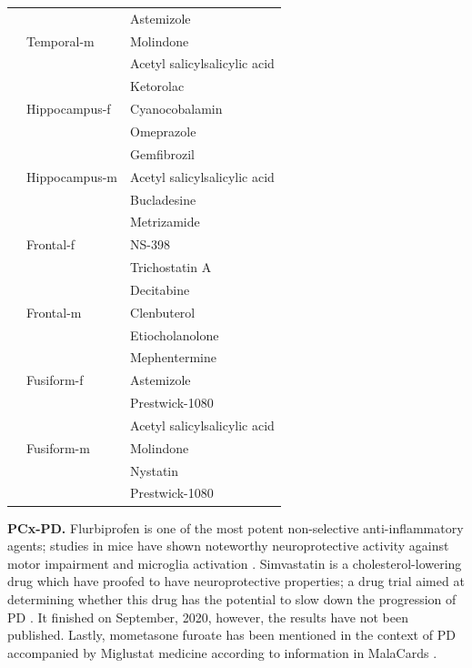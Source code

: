 \begin{table}[!ht]
\begin{tabular}{l|ll}
            &                   & Astemizole                   \\
            & Temporal-m        & Molindone                    \\
            &                   & Acetyl salicylsalicylic acid \\
            &                   & Ketorolac                    \\
            & Hippocampus-f     & Cyanocobalamin               \\
            &                   & Omeprazole                   \\
            &                   & Gemfibrozil                  \\
            & Hippocampus-m     & Acetyl salicylsalicylic acid \\
            &                   & Bucladesine                  \\
            &                   & Metrizamide                  \\
            & Frontal-f         & NS-398                       \\
            &                   & Trichostatin A               \\
            &                   & Decitabine                   \\
            & Frontal-m         & Clenbuterol                  \\
            &                   & Etiocholanolone              \\
            &                   & Mephentermine                \\
            & Fusiform-f        & Astemizole                   \\
            &                   & Prestwick-1080               \\
            &                   & Acetyl salicylsalicylic acid \\
            & Fusiform-m        & Molindone                    \\
            &                   & Nystatin                     \\
            &                   & Prestwick-1080               \\ \hline
\end{tabular}
\end{table}

\textbf{PCx-PD.} Flurbiprofen is one of the most potent non-selective anti-inflammatory agents; studies in mice have shown noteworthy neuroprotective activity against motor impairment and microglia activation \cite{lepiscopo}. Simvastatin is a cholesterol-lowering drug which have proofed to have neuroprotective properties; a drug trial aimed at determining whether this drug has the potential to slow down the progression of PD \cite{carroll}. It finished on September, 2020, however, the results have not been published. Lastly, mometasone furoate has been mentioned in the context of PD accompanied by Miglustat medicine according to information in MalaCards \cite{mometasona}.

